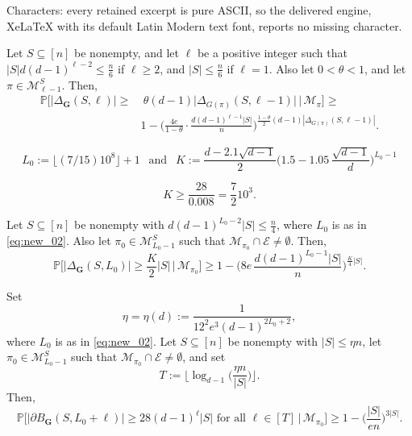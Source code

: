 \documentclass[10pt,a4paper]{amsart}
\begin{document}
Characters: every retained excerpt is pure ASCII, so the delivered engine, XeLaTeX with its default Latin Modern text font, reports no missing character.
\begin{corollary} \label{c2-pap1}
Let $S\subseteq [n]$ be nonempty, and let $\ell$ be a positive integer such that
$|S|d(d-1)^{\ell-2}\leqslant\frac{n}{6}$ if $\ell\geqslant 2$, and $|S|\leqslant \frac{n}{6}$ if $\ell=1$.
Also let $0<\theta<1$, and let $\pi\in\mathcal{M}^S_{\ell-1}$. Then,
\begin{align*}
\mathbb{P}\Big[ \big|\Delta_{\mathbf{G}}(S,\ell)\big|\geqslant & \
\theta (d-1) \big|\Delta_{G(\pi)}(S,\ell-1)\big| \, \Big| \, \mathcal{M}_{\pi} \Big] \geqslant \\
& 1 - \Big(\frac{4e}{1-\theta}\cdot \frac{d(d-1)^{\ell-1}|S|}{n}
\Big)^{\frac{1-\theta}{2} (d-1) |\Delta_{G(\pi)}(S,\ell-1)|}.
\end{align*}
\end{corollary}

\begin{equation}\label{eq:new_02}
L_0 := \big\lfloor(7/15)10^8\big\rfloor+1 \ \ \text{ and } \ \
K := \frac{d-2.1\sqrt{d-1}}{2}\Big( 1.5-1.05\,\frac{\sqrt{d-1}}{d} \Big)^{L_0-1}
\end{equation}

\begin{equation}\label{eq:new_04}
K\geqslant \frac{28}{0.008}=\frac{7}{2}10^3.
\end{equation}

\begin{corollary}\label{cor_new_base_step}
Let $S\subseteq [n]$ be nonempty with $d(d-1)^{L_0-2}|S|\leqslant\frac{n}{4}$, where $L_0$ is as in \eqref{eq:new_02}.
Also let $\pi_0\in\mathcal{M}^S_{L_0-1}$ such that $\mathcal{M}_{\pi_0}\cap\mathcal{E}\neq\emptyset$. Then,
\[\mathbb{P}\Big[ \big|\Delta_{\mathbf{G}}(S,L_0)\big|\geqslant \frac{K}{2} |S| \, \Big| \, \mathcal{M}_{\pi_0} \Big] \geqslant
1 - \Big(8e\, \frac{d(d-1)^{L_0-1}|S|}{n} \Big)^{\frac{K}{4} |S|}.\]
\end{corollary}

\begin{proposition} \label{p3-pap1}
Set
\begin{equation} \label{e-pap1-p1}
\eta=\eta(d):= \frac{1}{12^{2} e^{3} (d-1)^{2L_0+2}},
\end{equation}
where $L_0$ is as in \eqref{eq:new_02}.
Let $S\subseteq [n]$ be nonempty with $|S|\leqslant \eta n$,
let $\pi_0\in\mathcal{M}^S_{L_0-1}$ such that $\mathcal{M}_{\pi_0}\cap\mathcal{E}\neq\emptyset$, and set
\begin{equation} \label{e-pap-p2}
T:= \Big\lfloor \log_{d-1}\Big(\frac{\eta n}{|S|}\Big)\Big\rfloor.
\end{equation}
Then,
\begin{equation} \label{eqkt22}
\mathbb{P} \Big[ \big|\partial B_{\mathbf{G}}(S,L_0+\ell)\big| \geqslant
28  (d-1)^\ell |S| \text{ for all } \ell\in [T]  \, \Big| \, \mathcal{M}_{\pi_0} \Big]
 \geqslant 1- \Big(\frac{|S|}{en}\Big)^{3|S|}.
\end{equation}
\end{proposition}
\end{document}
